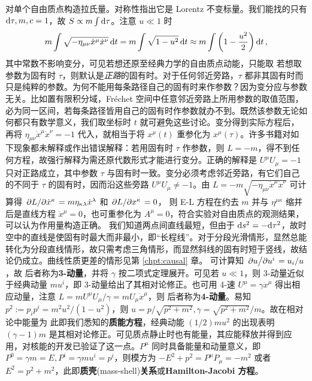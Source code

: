 对单个自由质点构造拉氏量。对称性指出它是 Lorentz 不变标量。我们能找的只有 $\dd\tau,m,c=1$，故 $S\propto m\int \dd\tau$。注意 $u\ll 1$ 时
\[
m\int\sqrt{-\eta_{\mu\nu}\dot x^\mu \dot x^\nu}\dd{t}=m\int\sqrt{1-u^2}\dd{t}\approx m\int\left(1-\frac{u^2}{2}\right)\dd{t},
\]
其中常数不影响变分，可见若想还原至经典力学的自由质点动能，只能取
若想取参数为固有时 $\tau$，则默认是\textit{正路}的固有时。对于任何邻近旁路，$\tau$ 都非其固有时而只是纯粹的参数。为何不能用每条路径自己的固有时来作参数？因为变分应与参数无关。比如置有限积分域，Fréchet 空间中任意邻近旁路上所用参数的取值范围，必为同一区间，若每条路径皆用自己的固有时作参数就办不到。既然该参数无论如何都只有数学意义，我们取坐标时 $t$ 就可避免这些讨论。变分得到实际方程后，再将 $\eta_{\mu\nu}\dot x^\mu \dot x^\nu=-1$ 代入，就相当于将 $x^\mu(t)$ 重参化为 $x^\mu(\tau)$。许多书籍对如下现象都未解释或作出错误解释：若用固有时 $\tau$ 作参数，则 $L=-m$，得不到任何方程，故强行解释为需还原代数形式才能进行变分。正确的解释是 $U^\mu U_\mu=-1$ 只对正路成立，其中参数 $\tau$ 与固有时一致。变分必须考虑邻近旁路，有它们自己的不同于 $\tau$ 的固有时，因而沿这些旁路 $U^\mu U_\mu\ne -1$。由 $L=-m\sqrt{-\eta_{\mu\nu}\dot x^\mu\dot x^\nu}$ 可计算得 $\pdv*{L}{\dot x^\kappa}=m\eta_{\kappa\lambda}\dot x^\lambda$ 和 $\pdv*{L}{x^\kappa}=0$，
则 E-L 方程在约去 $m$ 并与 $\eta^{\mu\kappa}$ 缩并后是直线方程 $\ddot x^\mu=0$，也可重参化为 $A^\mu=0$，符合实验对自由质点的观测结果，可以认为作用量构造正确。
我们知道两点间直线最短，但由于 $\dd s^2=-\dd\tau^2$，故时空中的直线是使固有时最大而非最小，即“长程线”。对于分段光滑情形，显然总能转化为分段直线情形，故只需考虑三角情形，而显然斜线的固有时短于竖线，故结论仍成立。曲线性质更差的情形见第 \ref{chpt:causal} 章。
可计算知 $\pdv*{u}{u^i}=u_i/u$，故
后者称为\textbf{3-动量}，并将 $\gamma$ 按二项式定理展开。可见若 $u\ll 1$，则 3-动量近似于经典动量 $m u^i$，即 3-动量给出了其相对论修正。也可用 4-速 $U^\mu=\gamma\dot x^\mu$ 得出相应动量，注意 $L=m U^\mu U_\mu/\gamma=m U_\mu \dot x^\mu$，则
后者称为\textbf{4-动量}。易知 $p^2:=p_i p^i=m^2u^2/(1-u^2)$，则 $u={p}/{\sqrt{p^2+m^2}},\gamma={\sqrt{p^2+m^2}}/{m}$。故在相对论中能量为
此即我们悉知的\textbf{质能方程}，经典动能 $(1/2)mu^{2}$ 的出现表明 $(\gamma-1)m$ 是其相对论修正。可见质点静止时也有能量，其应能释放并得到应用，对核能的开发已验证了这一点。$P^\mu$ 同时具备能量和动量意义，即 $P^0=\gamma m=E,P^i=\gamma m u^i=p^i$，则模方为 $-E^2+p^2=P^\mu P_\mu=-m^2$ 或者 $E^2= p^2+m^2$，此即\textbf{质壳}(mass-shell)\textbf{关系}或\textbf{Hamilton-Jacobi 方程}。

